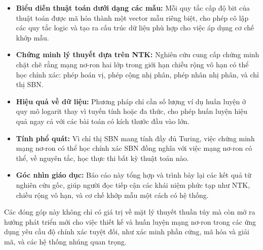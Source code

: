 \begin{itemize}
    \item \textbf{Biểu diễn thuật toán dưới dạng các mẫu:} Mỗi quy tắc cấp độ bit của thuật toán được mã hóa thành một vector mẫu riêng biệt, cho phép cô lập các quy tắc logic và tạo ra cấu trúc dữ liệu phù hợp cho việc áp dụng cơ chế khớp mẫu.
    
    \item \textbf{Chứng minh lý thuyết dựa trên NTK:} Nghiên cứu cung cấp chứng minh chặt chẽ rằng mạng nơ-ron hai lớp trong giới hạn chiều rộng vô hạn có thể học chính xác: phép hoán vị, phép cộng nhị phân, phép nhân nhị phân, và chỉ thị SBN.
    
    \item \textbf{Hiệu quả về dữ liệu:} Phương pháp chỉ cần số lượng ví dụ huấn luyện ở quy mô logarit thay vì tuyến tính hoặc đa thức, cho phép huấn luyện hiệu quả ngay cả với các bài toán có kích thước đầu vào lớn.
    
    \item \textbf{Tính phổ quát:} Vì chỉ thị SBN mang tính đầy đủ Turing, việc chứng minh mạng nơ-ron có thể học chính xác SBN đồng nghĩa với việc mạng nơ-ron có thể, về nguyên tắc, học thực thi bất kỳ thuật toán nào.
    
    \item \textbf{Góc nhìn giáo dục:} Báo cáo này tổng hợp và trình bày lại các kết quả từ nghiên cứu gốc, giúp người đọc tiếp cận các khái niệm phức tạp như NTK, chiều rộng vô hạn, và cơ chế khớp mẫu một cách có hệ thống.
\end{itemize}

Các đóng góp này không chỉ có giá trị về mặt lý thuyết thuần túy mà còn mở ra hướng phát triển mới cho việc thiết kế và huấn luyện mạng nơ-ron trong các ứng dụng yêu cầu độ chính xác tuyệt đối, như xác minh phần cứng, mã hóa và giải mã, và các hệ thống nhúng quan trọng.
